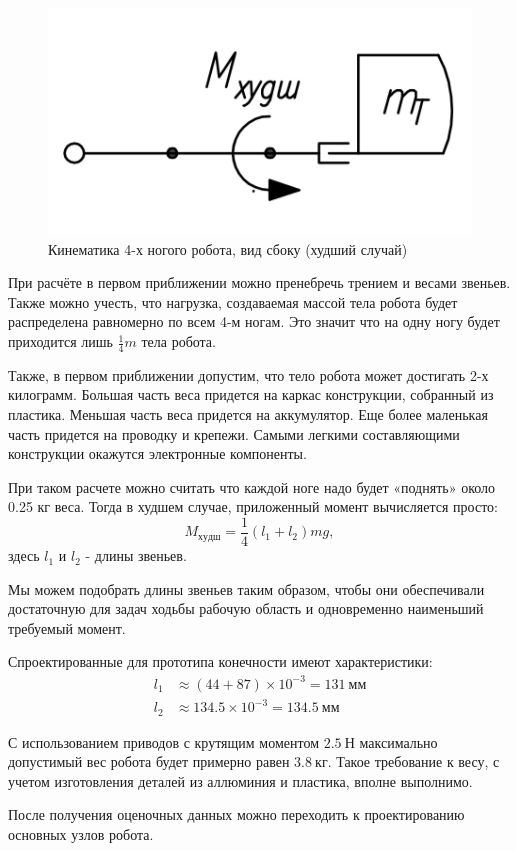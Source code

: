\begin{figure}[ht]
    \centering
    \includegraphics[scale=1]{kin2.png}
    \caption{Кинематика 4-х ногого робота, вид сбоку (худший случай)}
\end{figure}

При расчёте в первом приближении можно пренебречь трением и весами звеньев. Также можно учесть, что нагрузка, создаваемая массой тела робота будет распределена равномерно по всем 4-м ногам. Это значит что на одну ногу будет приходится лишь $\frac{1}{4}m$ тела робота.

Также, в первом приближении допустим, что тело робота может достигать 2-х килограмм. Большая часть веса придется на каркас конструкции, собранный из пластика. Меньшая часть веса придется на аккумулятор. Еще более маленькая часть придется на проводку и крепежи. Самыми легкими составляющими конструкции окажутся электронные компоненты.

При таком расчете можно считать что каждой ноге надо будет «поднять» около 0.25 кг веса. Тогда в худшем случае, приложенный момент вычисляется просто:
$$ M_{худш}= \frac 1 4 (l_{1}+l_{2}) m g, $$
\noindent здесь $l_1$ и $l_2$ - длины звеньев.

Мы можем подобрать длины звеньев таким образом, чтобы они обеспечивали достаточную для задач ходьбы рабочую область и одновременно наименьший требуемый момент.

Спроектированные для прототипа конечности имеют характеристики:
\begin{align*}
    l_1 &\approx (44 + 87) \times 10^{-3} = 131\: мм \\
    l_2 &\approx 134.5 \times 10^{-3} = 134.5\: мм
\end{align*}

\noindent С использованием приводов с крутящим моментом $ 2.5 \: Н $ максимально допустимый вес робота будет примерно равен $ 3.8 \: кг $. Такое требование к весу, с учетом изготовления деталей из аллюминия и пластика, вполне выполнимо.

После получения оценочных данных можно переходить к проектированию основных узлов робота.